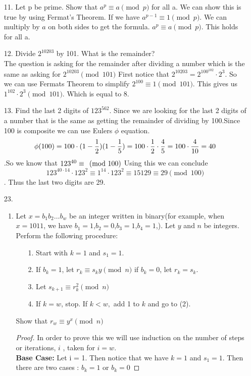 \documentclass[12pt]{article}
\begin{document}
\begin{enumerate}
      \item[11.] Let p be prime. Show that $a^p \equiv a \pmod{p}$ for all a.
            We can show this is true by using Fermat's Theorem. If we have $a^{p-1} \equiv 1 \pmod{p}$. We can multiply by $a$ on both sides to get the formula. $a^p \equiv a \pmod{p}$. This holds for all a.
      \item[12.] Divide $2^{10203}$ by 101. What is the remainder?\\
            The question is asking for the remainder after dividing a number which is the same as asking for $2^{10203} \pmod{101}$
            First notice that $2^{10203} = 2^{100^{102}} \cdot 2^3$. So we can use Fermats Theorem to simplify $2^{100} \equiv 1 \pmod{101}$. This gives us $1^{102} \cdot 2^3 \pmod{101}$. Which is equal to 8.
      \item[13.] Find the last 2 digits of $123^{562}$.
            Since we are looking for the last 2 digits of a number that is the same as getting the remainder of dividing by 100.Since 100 is composite we can use Eulers $\phi$ equation.\[
                  \phi(100) = 100 \cdot (1-\frac{1}{2})(1- \frac{1}{5}) = 100 \cdot \frac{1}{2} \cdot \frac{4}{5}= 100 \cdot \frac{4}{10} = 40 \\
            \].So we know that $123^{40} \equiv \pmod{100}\\$ Using this we can conclude \[
                  123^{40 \cdot 14}\cdot 123^2 \equiv 1^{14} \cdot 123^2   \equiv 15129 \equiv 29 \pmod{100}
            \]. Thus the last two digits are 29.
      \item[23.] \begin{enumerate}
                  \item Let $x = b_1 b_2 \dots b_w$ be an integer written in binary(for example, when $x = 1011$, we have $b_1 = 1$,$b_2 = 0$,$b_3 = 1$,$b_4 = 1$,). Let $y$ and $n$ be integers. Perform the following procedure:
                        \begin{enumerate}
                              \item[1.] Start with $k = 1$ and $s_1=1.$
                              \item[2.] If $b_k = 1$, let $r_k \equiv s_ky\pmod{n}$ if $b_k = 0$, let $r_k = s_k.$
                              \item[3.] Let $s_{k+1} \equiv r_k^2 \pmod{n}$
                              \item[4.] If $k=w$, stop. If $k<w,$ add 1 to $k$ and go to (2).
                        \end{enumerate}
                        Show that $r_w \equiv y^x \pmod{n}$
                        \begin{proof}
                              In order to prove this we will use induction on the number of steps or iterations, $i$ , taken for $i = w$.
                              \\
                              \textbf{Base Case:}
                              Let i = 1. Then notice that we have $k = 1$ and $s_1=1.$ Then there are two cases : $b_k = 1$ or $b_k =0$


\end{proof}
\end{enumerate}
\end{enumerate}
\end{document}
